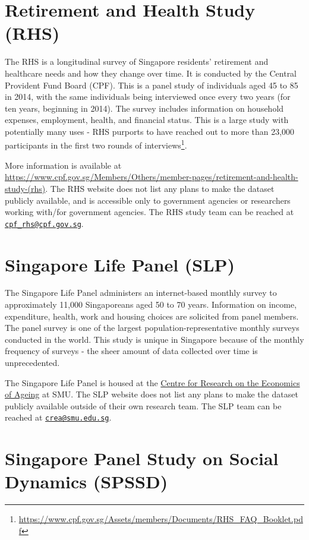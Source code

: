 \documentclass[openany]{book}
\let\rmarkdownfootnote\footnote%
\def\footnote{\protect\rmarkdownfootnote}
\begin{document}
\section{Retirement and Health Study (RHS)}\label{rhs}

The RHS is a longitudinal survey of Singapore residents' retirement and
healthcare needs and how they change over time. It is conducted by the
Central Provident Fund Board (CPF). This is a panel study of individuals
aged 45 to 85 in 2014, with the same individuals being interviewed once
every two years (for ten years, beginning in 2014). The survey includes
information on household expenses, employment, health, and financial
status. This is a large study with potentially many uses - RHS purports
to have reached out to more than 23,000 participants in the first two
rounds of interviews\footnote{\url{https://www.cpf.gov.sg/Assets/members/Documents/RHS_FAQ_Booklet.pdf}}.

More information is available at
\url{https://www.cpf.gov.sg/Members/Others/member-pages/retirement-and-health-study-(rhs)}.
The RHS website does not list any plans to make the dataset publicly
available, and is accessible only to government agencies or researchers
working with/for government agencies. The RHS study team can be reached
at \href{mailto:cpf_rhs@cpf.gov.sg}{\nolinkurl{cpf\_rhs@cpf.gov.sg}}.

\section{Singapore Life Panel (SLP)}\label{slp}

The Singapore Life Panel administers an internet-based monthly survey to
approximately 11,000 Singaporeans aged 50 to 70 years. Information on
income, expenditure, health, work and housing choices are solicited from
panel members. The panel survey is one of the largest
population-representative monthly surveys conducted in the world. This
study is unique in Singapore because of the monthly frequency of surveys
- the sheer amount of data collected over time is unprecedented.

The Singapore Life Panel is housed at the
\href{https://crea.smu.edu.sg/singapore-monthly-panel}{Centre for
Research on the Economics of Ageing} at SMU. The SLP website does not
list any plans to make the dataset publicly available outside of their
own research team. The SLP team can be reached at
\href{mailto:crea@smu.edu.sg}{\nolinkurl{crea@smu.edu.sg}}.

\section{Singapore Panel Study on Social Dynamics (SPSSD)}\label{spssd}
\end{document}
